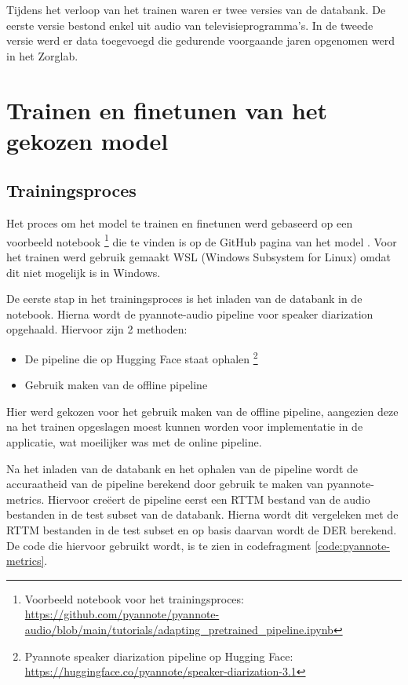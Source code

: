 Tijdens het verloop van het trainen waren er twee versies van de databank. De eerste versie bestond enkel uit audio van televisieprogramma's. In de tweede versie werd er data toegevoegd die gedurende voorgaande jaren opgenomen werd in het Zorglab.

\section{Trainen en finetunen van het gekozen model}
\label{sec:trainen}

\subsection{Trainingsproces}
\label{subsec:proces}
Het proces om het model te trainen en finetunen werd gebaseerd op een voorbeeld notebook \footnote{Voorbeeld notebook voor het trainingsproces: \url{https://github.com/pyannote/pyannote-audio/blob/main/tutorials/adapting_pretrained_pipeline.ipynb}} die te vinden is op de GitHub pagina van het model \autocite{Bredin2024}. Voor het trainen werd gebruik gemaakt WSL (Windows Subsystem for Linux) omdat dit niet mogelijk is in Windows.

De eerste stap in het trainingsproces is het inladen van de databank in de notebook. Hierna wordt de pyannote-audio pipeline voor speaker diarization opgehaald. Hiervoor zijn 2 methoden:
\begin{itemize}
	\item De pipeline die op Hugging Face staat ophalen \footnote{Pyannote speaker diarization pipeline op Hugging Face: \url{https://huggingface.co/pyannote/speaker-diarization-3.1}}
	\item Gebruik maken van de offline pipeline
\end{itemize}
Hier werd gekozen voor het gebruik maken van de offline pipeline, aangezien deze na het trainen opgeslagen moest kunnen worden voor implementatie in de applicatie, wat moeilijker was met de online pipeline.

Na het inladen van de databank en het ophalen van de pipeline wordt de accuraatheid van de pipeline berekend door gebruik te maken van pyannote-metrics. Hiervoor creëert de pipeline eerst een RTTM bestand van de audio bestanden in de test subset van de databank. Hierna wordt dit vergeleken met de RTTM bestanden in de test subset en op basis daarvan wordt de DER berekend. De code die hiervoor gebruikt wordt, is te zien in codefragment \ref{code:pyannote-metrics}.

